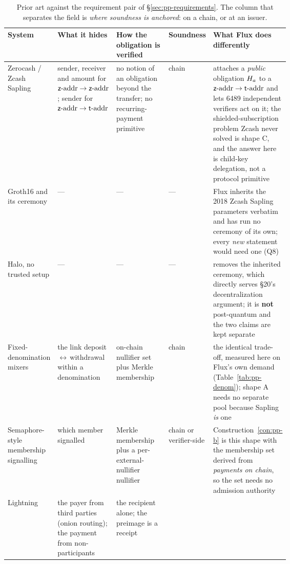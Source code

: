 \begin{table}[H]
\centering
\scriptsize
\caption{Prior art against the requirement pair of \S\ref{sec:pp-requirements}. The column that
separates the field is \emph{where soundness is anchored}: on a chain, or at an issuer.}
\label{tab:pp-related}
\begin{tabular}{@{}lp{0.20\linewidth}p{0.22\linewidth}lp{0.22\linewidth}@{}}
\toprule
\textbf{System} & \textbf{What it hides} & \textbf{How the obligation is verified} & \textbf{Soundness} & \textbf{What Flux does differently} \\
\midrule
Zerocash / Zcash Sapling \citep{bensasson2014zerocash,zcashprotocol} &
sender, receiver and amount for $\mathsf{z}\text{-addr}\to\mathsf{z}\text{-addr}$; sender for $\mathsf{z}\text{-addr}\to\mathsf{t}\text{-addr}$ &
no notion of an obligation beyond the transfer; no recurring-payment primitive &
chain &
attaches a \emph{public} obligation $H_{a}$ to a $\mathsf{z}\text{-addr}\to\mathsf{t}\text{-addr}$ and lets \num{6489} independent
verifiers act on it; the shielded-subscription problem Zcash never solved is shape C, and the answer
here is child-key delegation, not a protocol primitive \\
\addlinespace
Groth16 and its ceremony \citep{groth2016size,bowe2017mpc} &
--- &
--- &
--- &
Flux inherits the 2018 Zcash Sapling parameters verbatim and has run no ceremony of its own; every
\emph{new} statement would need one (Q8) \\
\addlinespace
Halo, no trusted setup \citep{bowe2019halo} &
--- &
--- &
--- &
removes the inherited ceremony, which directly serves \S20's decentralization argument; it is
\textbf{not} post-quantum and the two claims are kept separate \\
\addlinespace
Fixed-denomination mixers &
the link deposit\,$\leftrightarrow$\,withdrawal within a denomination &
on-chain nullifier set plus Merkle membership &
chain &
the identical trade-off, measured here on Flux's own demand (Table~\ref{tab:pp-denom}); shape A needs
no separate pool because Sapling \emph{is} one \\
\addlinespace
Semaphore-style membership signalling &
which member signalled &
Merkle membership plus a per-external-nullifier nullifier &
chain or verifier-side &
Construction~\ref{con:pp-b} is this shape with the membership set derived from \emph{payments on
chain}, so the set needs no admission authority \\
\addlinespace
Lightning \citep{poon2016lightning} &
the payer from third parties (onion routing); the payment from non-participants &
the recipient alone; the preimage is a receipt &

\end{tabular}
\end{table}
